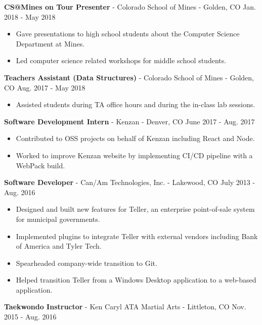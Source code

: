\documentclass[10pt,letterpaper]{article}
\begin{document}
\vspace{2pt}
\textbf{CS@Mines on Tour Presenter} - Colorado School of Mines -
Golden, CO \hfill Jan. 2018 - May 2018
\begin{itemize}
    \item Gave presentations to high school students about the Computer Science
        Department at Mines.
    \item Led computer science related workshops for middle school students.
\end{itemize}

\vspace{2pt}
\textbf{Teachers Assistant (Data Structures)} - Colorado School of Mines -
Golden, CO \hfill Aug. 2017 - May 2018
\begin{itemize}
    \item Assisted students during TA office hours and during the in-class lab
        sessions.
\end{itemize}

\vspace{2pt}
\textbf{Software Development Intern} - Kenzan - Denver, CO
\hfill June 2017 - Aug. 2017
\begin{itemize}
    \item Contributed to OSS projects on behalf of Kenzan including React and
        Node.
    \item Worked to improve Kenzan website by implementing CI/CD pipeline with
        a WebPack build.
\end{itemize}

\vspace{2pt}
\textbf{Software Developer} - Can/Am Technologies, Inc. - Lakewood, CO
\hfill July 2013 - Aug. 2016
\begin{itemize}
    \item Designed and built new features for Teller, an enterprise
        point-of-sale system for municipal governments.
    \item Implemented plugins to integrate Teller with external vendors
        including Bank of America and Tyler Tech.
    \item Spearheaded company-wide transition to Git.
    \item Helped transition Teller from a Windows Desktop application to a
        web-based application.
\end{itemize}

\vspace{2pt}
\textbf{Taekwondo Instructor} - Ken Caryl ATA Martial Arts - Littleton, CO
\hfill Nov. 2015 - Aug. 2016
\end{document}
